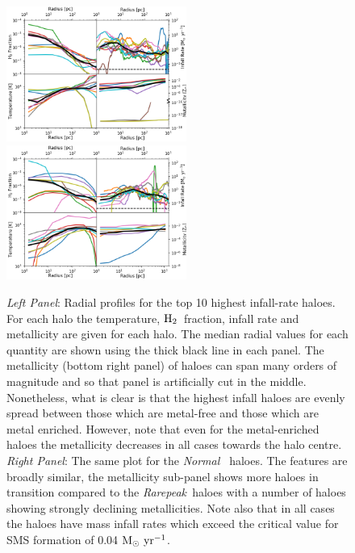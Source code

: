 \documentclass[graphics, twocolumn, usenatbib]{mn2e}
\newcommand{\msolaryrc} {$\rm{M_{\odot}~yr^{-1}}$}
\newcommand{\molH} {$\rm{H_2}$~}
\newcommand{\rarepeak} {\textit{Rarepeak~}}
\newcommand{\normal} {\textit{Normal~}}
\begin{document}
\begin{figure}
\centering
\begin{minipage}{175mm}      \begin{center} 
\centerline{
\includegraphics[width=0.525\textwidth]{FIGURES/MultiPlot_Rarepeak.png}
\includegraphics[width=0.525\textwidth]{FIGURES/MultiPlot_Normal.png}}
\caption{\textit{Left Panel}: Radial profiles for the top 10 highest infall-rate haloes. For
  each halo the temperature, \molH fraction, infall rate and metallicity are given for
  each halo. The median radial values for each quantity are shown using the
  thick black line in each panel. The metallicity (bottom right panel) of haloes can span many
  orders of magnitude and so that panel is artificially cut in the middle. Nonetheless, what is
  clear is that the highest infall haloes are evenly spread between those which are metal-free and
  those which are metal enriched. However, note that even for the metal-enriched haloes the
  metallicity decreases in all cases towards the halo centre. 
  \textit{Right Panel}: The same plot for the \normal
  haloes. The features are broadly similar, the metallicity sub-panel shows more haloes in transition
  compared to the \rarepeak haloes with a number of haloes showing strongly declining metallicities.
  Note also that in all cases the haloes have mass infall rates which exceed the critical value
  for SMS formation of 0.04 \msolaryrc.
} \label{Fig:RadialProfiles}
\end{center} \end{minipage}

\end{figure}
\end{document}
